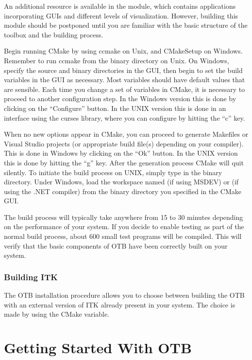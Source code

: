 An additional resource is available in the  module,
which contains applications incorporating GUIs and different levels
of visualization.  However, building this module
should be postponed until you are familiar with the basic structure of the
toolbox and the building process. 

Begin running CMake by using
ccmake on Unix, and CMakeSetup on
Windows. Remember to run ccmake from the binary directory on Unix. On
Windows, specify the source and binary directories in the GUI, then begin to
set the build variables in the GUI as necessary.  Most variables should have
default values that are sensible. Each time you change a set of variables in
CMake, it is necessary to proceed to another configuration step. In the
Windows version this is done by clicking on the ``Configure'' button. In the
UNIX version this is done in an interface using the 
curses library, where you can configure by hitting the ``c'' key.

When no new options appear in CMake, you can proceed to generate Makefiles or
Visual Studio projects (or appropriate build file(s) depending on your
compiler). This is done in Windows by clicking on the ``Ok'' button.  In the
UNIX version this is done by hitting the ``g'' key. After the generation
process CMake will quit silently. To initiate the build process on UNIX,
simply type  in the binary directory. Under Windows, load the
workspace named  (if using MSDEV) or  (if using
the .NET compiler) from the binary directory you specified in the CMake GUI.

The build process will typically take anywhere from 15 to 30 minutes depending
on the performance of your system. If you decide to enable testing as part of
the normal build process, about 600 small test programs will be compiled. This
will verify that the basic components of OTB have been correctly built on your
system.

\subsubsection{Building ITK}

The OTB installation procedure allows you to choose between building
the OTB with an external version of ITK already present in your
system. The choice is made by using the 
CMake variable.

\section{Getting Started With OTB }
\label{sec:GettingStartedWithOTB}
 
